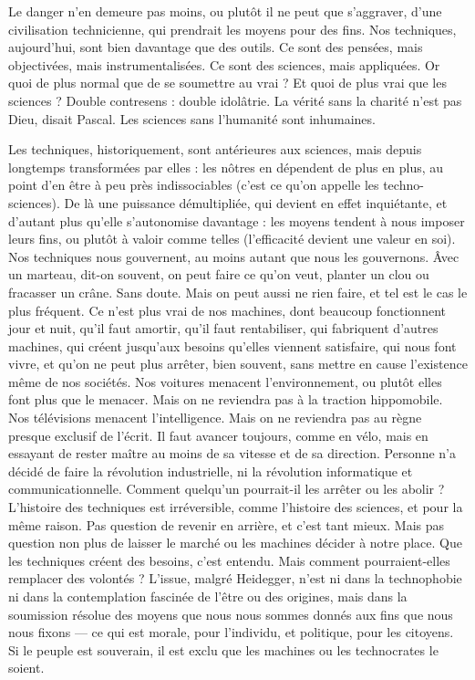 Le danger n’en demeure pas moins, ou plutôt il ne peut que s’aggraver,
d’une civilisation technicienne, qui prendrait les moyens pour des fins. Nos
techniques, aujourd’hui, sont bien davantage que des outils. Ce sont des pensées,
mais objectivées, mais instrumentalisées. Ce sont des sciences, mais appliquées.
Or quoi de plus normal que de se soumettre au vrai ? Et quoi de plus
vrai que les sciences ? Double contresens : double idolâtrie. La vérité sans la
charité n’est pas Dieu, disait Pascal. Les sciences sans l'humanité sont inhumaines.

Les techniques, historiquement, sont antérieures aux sciences, mais depuis
longtemps transformées par elles : les nôtres en dépendent de plus en plus, au
point d’en être à peu près indissociables (c’est ce qu’on appelle les techno-sciences).
De là une puissance démultipliée, qui devient en effet inquiétante, et
d'autant plus qu’elle s’autonomise davantage : les moyens tendent à nous
imposer leurs fins, ou plutôt à valoir comme telles (l’efficacité devient une
valeur en soi). Nos techniques nous gouvernent, au moins autant que nous les
gouvernons. Âvec un marteau, dit-on souvent, on peut faire ce qu’on veut,
planter un clou ou fracasser un crâne. Sans doute. Mais on peut aussi ne rien
faire, et tel est le cas le plus fréquent. Ce n’est plus vrai de nos machines, dont
beaucoup fonctionnent jour et nuit, qu’il faut amortir, qu’il faut rentabiliser,
qui fabriquent d’autres machines, qui créent jusqu'aux besoins qu’elles viennent
satisfaire, qui nous font vivre, et qu’on ne peut plus arrêter, bien souvent,
sans mettre en cause l’existence même de nos sociétés. Nos voitures menacent
l’environnement, ou plutôt elles font plus que le menacer. Mais on ne
reviendra pas à la traction hippomobile. Nos télévisions menacent l’intelligence.
Mais on ne reviendra pas au règne presque exclusif de l'écrit. Il faut
avancer toujours, comme en vélo, mais en essayant de rester maître au moins
de sa vitesse et de sa direction. Personne n’a décidé de faire la révolution industrielle,
ni la révolution informatique et communicationnelle. Comment
quelqu'un pourrait-il les arrêter ou les abolir ? L'histoire des techniques est irréversible,
comme l’histoire des sciences, et pour la même raison. Pas question de
revenir en arrière, et c’est tant mieux. Mais pas question non plus de laisser le
marché ou les machines décider à notre place. Que les techniques créent des
besoins, c’est entendu. Mais comment pourraient-elles remplacer des volontés ?
L'issue, malgré Heidegger, n’est ni dans la technophobie ni dans la contemplation
fascinée de l’être ou des origines, mais dans la soumission résolue des
moyens que nous nous sommes donnés aux fins que nous nous fixons — ce qui
est morale, pour l'individu, et politique, pour les citoyens. Si le peuple est souverain,
il est exclu que les machines ou les technocrates le soient.

